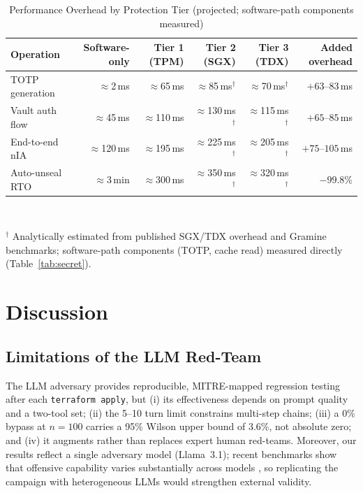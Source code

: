 \documentclass[journal]{IEEEtran}
\begin{document}
\begin{table}[!t]
\caption{Performance Overhead by Protection Tier (projected; software-path components measured)}
\label{tab:perf}
\centering
\footnotesize
\begin{tabular}{@{}lrrrrr@{}}
\toprule
\textbf{Operation} & \textbf{Software-only} & \textbf{Tier 1 (TPM)} & \textbf{Tier 2 (SGX)} & \textbf{Tier 3 (TDX)} & \textbf{Added overhead} \\
\midrule
TOTP generation      & $\approx$2\,ms   & $\approx$65\,ms  & $\approx$85\,ms$^\dagger$  & $\approx$70\,ms$^\dagger$  & $+63$--$83$\,ms \\
Vault auth flow      & $\approx$45\,ms  & $\approx$110\,ms & $\approx$130\,ms$^\dagger$ & $\approx$115\,ms$^\dagger$ & $+65$--$85$\,ms \\
End-to-end nIA       & $\approx$120\,ms & $\approx$195\,ms & $\approx$225\,ms$^\dagger$ & $\approx$205\,ms$^\dagger$ & $+75$--$105$\,ms \\
Auto-unseal RTO      & $\approx$3\,min  & $\approx$300\,ms & $\approx$350\,ms$^\dagger$ & $\approx$320\,ms$^\dagger$ & $-99.8\%$ \\
\bottomrule
\end{tabular}
\\[2pt]
\raggedright\footnotesize $^\dagger$ Analytically estimated from published SGX/TDX overhead \cite{coppolino2025} and
Gramine benchmarks; software-path components (TOTP, cache read) measured
directly (Table~\ref{tab:secret}).
\end{table}

\section{Discussion}\label{sec:disc}
\subsection{Limitations of the LLM Red-Team}
The LLM adversary provides reproducible, MITRE-mapped regression testing after
each \texttt{terraform apply}, but (i) its effectiveness depends on prompt
quality and a two-tool set; (ii) the 5--10 turn limit constrains multi-step
chains; (iii) a 0\% bypass at $n{=}100$ carries a 95\% Wilson upper bound of
3.6\%, not absolute zero; and (iv) it augments rather than replaces expert
human red-teams. Moreover, our results reflect a single adversary model
(Llama~3.1); recent benchmarks show that offensive capability varies
substantially across models \cite{muzsai2024hacksynth,gioacchini2024autopenbench,
bhatt2024cyberseceval2}, so replicating the campaign with heterogeneous LLMs
would strengthen external validity.
\end{document}

